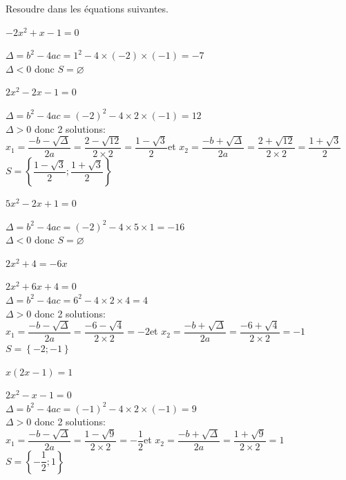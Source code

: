 \documentclass[11pt,a4paper]{article}  %
\begin{document}
Resoudre dans \R les équations suivantes.
\begin{enumMet}
	\item $-2 x^2+x-1=0$
	\begin{corrBox}
		$\Delta=b^2-4ac=1^2-4\times(-2)\times(-1)=-7$\\
		$\Delta<0$ donc $S=\varnothing$
	\end{corrBox}
	\item $2 x^2-2 x-1=0$
	\begin{corrBox}
		$\Delta=b^2-4ac=(-2)^2-4\times2\times(-1)=12$\\
		$\Delta>0$ donc 2 solutions:\\
		$x_1=\dfrac{-b-\sqrt{\Delta}}{2a}=\dfrac{2-\sqrt{12}}{2\times2}=\dfrac{1-\sqrt{3}}{2}$\quad et \quad $x_2=\dfrac{-b+\sqrt{\Delta}}{2a}=\dfrac{2+\sqrt{12}}{2\times2}=\dfrac{1+\sqrt{3}}{2}$\\
		$S=\left\{\dfrac{1-\sqrt{3}}{2};\dfrac{1+\sqrt{3}}{2}\right\}$
	\end{corrBox}
	\item $5 x^2-2 x+1=0$
	\begin{corrBox}
		$\Delta=b^2-4ac=(-2)^2-4\times5\times1=-16$\\
		$\Delta<0$ donc $S=\varnothing$
	\end{corrBox}
	\item $2 x^2+4=-6 x$
	\begin{corrBox}
		$2 x^2+6 x+4=0$\\
		$\Delta=b^2-4ac=6^2-4\times2\times4=4$\\
		$\Delta>0$ donc 2 solutions:\\
		$x_1=\dfrac{-b-\sqrt{\Delta}}{2a}=\dfrac{-6-\sqrt{4}}{2\times2}=-2$\quad et \quad $x_2=\dfrac{-b+\sqrt{\Delta}}{2a}=\dfrac{-6+\sqrt{4}}{2\times2}=-1$\\
		$S=\left\{-2;-1\right\}$
	\end{corrBox}
	\item $x(2 x-1)=1$
	\begin{corrBox}
		$2x^2-x-1=0$\\
		$\Delta=b^2-4ac=(-1)^2-4\times2\times(-1)=9$\\
		$\Delta>0$ donc 2 solutions:\\
		$x_1=\dfrac{-b-\sqrt{\Delta}}{2a}=\dfrac{1-\sqrt{9}}{2\times2}=-\dfrac{1}{2}$\quad et \quad $x_2=\dfrac{-b+\sqrt{\Delta}}{2a}=\dfrac{1+\sqrt{9}}{2\times2}=1$\\
		$S=\left\{-\dfrac{1}{2};1\right\}$

\end{corrBox}
\end{enumMet}
\end{document}
